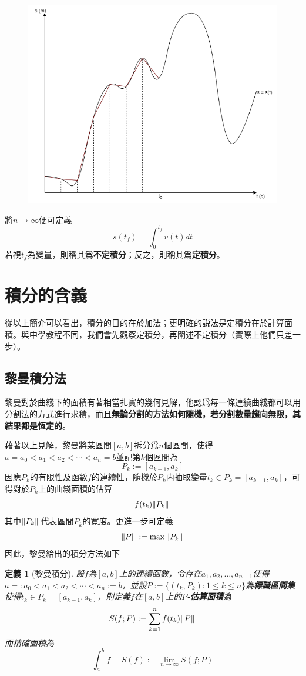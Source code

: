 \documentclass[12pt]{article}
\newtheorem{definition}{定義}
\begin{document}
    \begin{figure}[H]
        \centering
        \includegraphics[scale=0.6]{partition s-t.png}
    \end{figure}

    將$n\to\infty$便可定義$$s(t_f)=\int_{0}^{t_f}v(t)dt$$若視$t_f$為變量，則稱其爲\textbf{不定積分}；反之，則稱其爲\textbf{定積分}。
    
    \section*{積分的含義}
    從以上簡介可以看出，積分的目的在於加法；更明確的説法是定積分在於計算面積。與中學教程不同，我們會先觀察定積分，再闡述不定積分（實際上他們只差一步）。

    \subsection*{黎曼積分法}
    黎曼對於曲綫下的面積有著相當扎實的幾何見解，他認爲每一條連續曲綫都可以用分割法的方式進行求積，而且\textbf{無論分割的方法如何隨機，若分割數量趨向無限，其結果都是恆定的}。

    藉著以上見解，黎曼將某區間$[a,b]$拆分爲$n$個區間，使得$a=a_0<a_1<a_2<\cdots<a_n=b$並記第$k$個區間為$$P_k:=[a_{k-1},a_k]$$因應$P_k$的有限性及函數$f$的連續性，隨機於$P_k$内抽取變量$t_k\in P_k=[a_{k-1},a_k]$，可得對於$P_k$上的曲綫面積的估算$$f(t_k)\norm*{P_k}$$其中$\norm*{P_k}$代表區間$P_k$的寬度。更進一步可定義$$\norm*{P}:=\max{\norm*{P_k}}$$因此，黎曼給出的積分方法如下

    \begin{definition}[黎曼積分]
        設$f$為$[a,b]$上的連續函數，令存在$a_1,a_2,\dots,a_{n-1}$使得$a=:a_0<a_1<a_2<\cdots<a_n:=b$，並設$P:=\{(t_k,P_k):1\leq k\leq n\}$為\textbf{標識區間集}使得$t_k\in P_k=[a_{k-1},a_k]$，則定義$f$在$[a,b]$上的\textbf{$P$-估算面積}為$$S(f;P):=\sum_{k=1}^{n}f(t_k)\norm*{P}$$
        而精確面積為$$\int_{a}^{b}f=S(f):=\lim_{n\to \infty}S(f;P)$$
    \end{definition}
\end{document}
